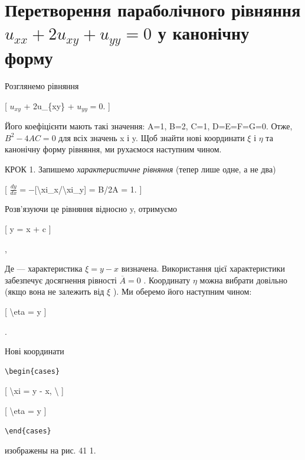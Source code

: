 \documentclass[
]{article}
\begin{document}
{{{\section{\texorpdfstring{Перетворення параболічного рівняння
\(u_{xx} + 2u_{xy} + u_{yy} = 0\) у канонічну
форму}{Перетворення параболічного рівняння u\_\{xx\} + 2u\_\{xy\} + u\_\{yy\} = 0 у канонічну форму}}\label{ux43fux435ux440ux435ux442ux432ux43eux440ux435ux43dux43dux44f-ux43fux430ux440ux430ux431ux43eux43bux456ux447ux43dux43eux433ux43e-ux440ux456ux432ux43dux44fux43dux43dux44f-u_xx-2u_xy-u_yy-0-ux443-ux43aux430ux43dux43eux43dux456ux447ux43dux443-ux444ux43eux440ux43cux443}

Розглянемо рівняння

{[} \(u_{xy}\) + 2u\_\{xy\} + \(u_{yy} = 0\). {]}

Його коефіцієнти мають такі значення: A=1, B=2, C=1, D=E=F=G=0. Отже,
\(B^2-4AC=0\) для всіх значень x і y. Щоб знайти нові координати \(\xi\)
і \(\eta\) та канонічну форму рівняння, ми рухаємося наступним чином.

КРОК 1. Запишемо \emph{характеристичне рівняння} (тепер лише одне, а не
два)

{[} \(\frac{dy}{dx} = -\){[}\textbackslash xi\_x/\textbackslash xi\_y{]}
= B/2A = 1. {]}

Розв'язуючи це рівняння відносно y, отримуємо

{[} y = x + c {]}

,

Де --- характеристика \(\xi = y - x\) визначена. Використання цієї
характеристики забезпечує досягнення рівності \(\overline{A} = 0\) .
Координату \(\eta\) можна вибрати довільно (якщо вона не залежить від
\(\xi\) ). Ми оберемо його наступним чином:

{[} \textbackslash eta = y {]}

.

Нові координати

\begin{verbatim}
\begin{cases}
\end{verbatim}

{[} \textbackslash xi = y - x, \textbackslash{} {]}

{[} \textbackslash eta = y {]}

\begin{verbatim}
\end{cases}
\end{verbatim}

изображены на рис. 41 1.

}}}
\end{document}
